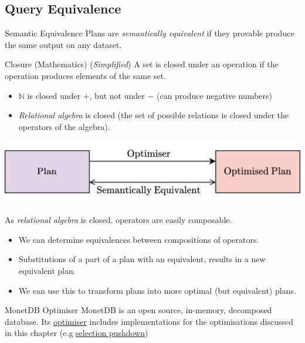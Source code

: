 \subsection{Query Equivalence}
\begin{definitionbox}{Semantic Equivalence}
    Plans are \textit{semantically equivalent} if they provable produce the same output on any dataset.
\end{definitionbox}
\begin{definitionbox}{Closure (Mathematics)}
    (\textit{Simplified}) A set is closed under an operation if the operation produces elements of the same set.
    \begin{itemize}
        \item $\mathbb{N}$ is closed under $+$, but not under $-$ (can produce negative numbers)
        \item \textit{Relational algebra} is closed (the set of possible relations is closed under the operators of the algebra).
    \end{itemize}
\end{definitionbox}
\begin{center}
    \includegraphics[width=.7\textwidth]{optimisation/images/semantic_equivalence.drawio.png}
\end{center}
As \textit{relational algebra} is closed, operators are easily composable.
\begin{itemize}
    \item We can determine equivalences between compositions of operators.
    \item Substitutions of a part of a plan with an equivalent, results in a new equivalent plan.
    \item We can use this to transform plans into more optimal (but equivalent) plans.
\end{itemize}

\begin{sidenotebox}{MonetDB Optimiser}
    MonetDB is an open source, in-memory, decomposed database. Its \href{https://github.com/MonetDB/MonetDB/blob/master/monetdb5/optimizer/optimizer.c}{optimiser} includes implementations for the optimisations discussed in this chapter (e.g \href{https://github.com/MonetDB/MonetDB/blob/master/monetdb5/optimizer/opt_pushselect.c}{selection pushdown})
\end{sidenotebox}


